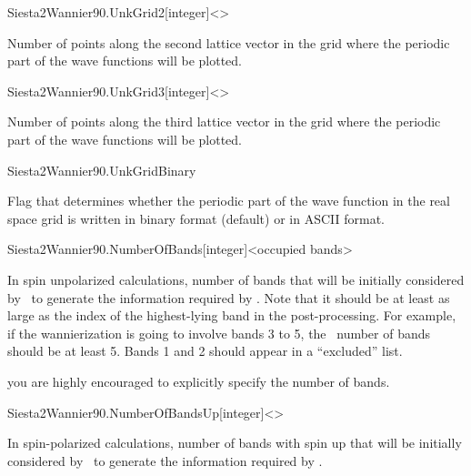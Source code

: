 \begin{fdfentry}{Siesta2Wannier90.UnkGrid2}[integer]<>

  Number of points along the second lattice vector in the grid where
  the periodic part of the wave functions will be plotted.

\end{fdfentry}

\begin{fdfentry}{Siesta2Wannier90.UnkGrid3}[integer]<>

  Number of points along the third lattice vector in the grid where
  the periodic part of the wave functions will be plotted.

\end{fdfentry}


\begin{fdflogicalT}{Siesta2Wannier90.UnkGridBinary}
  
  Flag that determines whether the periodic part of the wave function
  in the real space grid is written in binary format (default) or in
  ASCII format.

\end{fdflogicalT}

\begin{fdfentry}{Siesta2Wannier90.NumberOfBands}[integer]<occupied bands>
  
  In spin unpolarized calculations, number of bands that will be
  initially considered by \siesta\ to generate the information
  required by . Note that it should be at least as
  large as the index of the highest-lying band in the
   post-processing. For example, if the
  wannierization is going to involve bands 3 to 5, the \siesta\ number
  of bands should be at least 5. Bands 1 and 2 should appear in a
  ``excluded'' list.

  \note you are highly encouraged to explicitly specify the number of
  bands.

\end{fdfentry}

\begin{fdfentry}{Siesta2Wannier90.NumberOfBandsUp}[integer]<>

  In spin-polarized calculations, number of bands with spin up that
  will be initially considered by \siesta\ to generate the information
  required by . 

\end{fdfentry}

